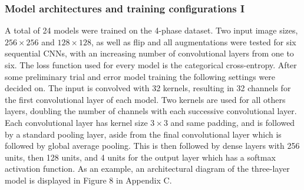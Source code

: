 \documentclass[12pt]{article}
\begin{document}
\subsubsection{Model architectures and training configurations I}
A total of 24 models were trained on the 4-phase dataset. Two input image sizes, $256 \times 256$ and $128 \times 128$, as well as flip and all augmentations were tested for six sequential CNNs, with an increasing number of convolutional layers from one to six.  The loss function used for every model is the categorical cross-entropy. After some preliminary trial and error model training the following settings were decided on. The input is convolved with 32 kernels, resulting in 32 channels for the first convolutional layer of each model. Two kernels are used for all others layers, doubling the number of channels with each successive convolutional layer. Each convolutional layer has kernel size $3 \times 3$ and same padding, and is followed by a standard pooling layer, aside from the final convolutional layer which is followed by global average pooling. This is then followed by dense layers with 256 units, then 128 units, and 4 units for the output layer which has a softmax activation function. As an example, an architectural diagram of the three-layer model is displayed in Figure 8 in Appendix C.
\end{document}
